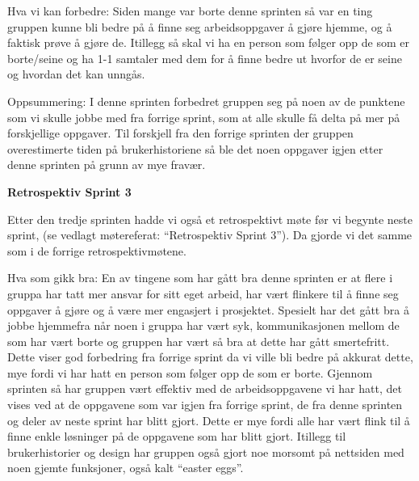\documentclass[12pt,a4paper,norsk]{article}
\begin{document}
Hva vi kan forbedre:
Siden mange var borte denne sprinten så var en ting gruppen kunne bli bedre på å finne seg arbeidsoppgaver å gjøre hjemme, og å faktisk prøve å gjøre de.
Itillegg så skal vi ha en person som følger opp de som er borte/seine og ha 1-1 samtaler med dem for å finne bedre ut hvorfor de er seine og hvordan det kan unngås. 

Oppsummering:
I denne sprinten forbedret gruppen seg på noen av de punktene som vi skulle jobbe med fra forrige sprint, som at alle skulle få delta på mer på forskjellige oppgaver. Til forskjell fra den forrige sprinten der gruppen overestimerte tiden på brukerhistoriene så ble det noen oppgaver igjen etter denne sprinten på grunn av mye fravær. 

\bigskip \noindent \textbf{Retrospektiv Sprint 3}
\par Etter den tredje sprinten hadde vi også et retrospektivt møte før vi begynte neste sprint, (se vedlagt møtereferat: “Retrospektiv Sprint 3”). Da gjorde vi det samme som i de forrige retrospektivmøtene. 

Hva som gikk bra:
En av tingene som har gått bra denne sprinten er at flere i gruppa har tatt mer ansvar for sitt eget arbeid, har vært flinkere til å finne seg oppgaver å gjøre og å være mer engasjert i prosjektet. Spesielt har det gått bra å jobbe hjemmefra når noen i gruppa har vært syk, kommunikasjonen mellom de som har vært borte og gruppen har vært så bra at dette har gått smertefritt. Dette viser god forbedring fra forrige sprint da vi ville bli bedre på akkurat dette, mye fordi vi har hatt en person som følger opp de som er borte. 
Gjennom sprinten så har gruppen vært effektiv med de arbeidsoppgavene vi har hatt, det vises ved at de oppgavene som var igjen fra forrige sprint, de fra denne sprinten og deler av neste sprint har blitt gjort. Dette er mye fordi alle har vært flink til å finne enkle løsninger på de oppgavene som har blitt gjort. 
Itillegg til brukerhistorier og design har gruppen også gjort noe morsomt på nettsiden med noen gjemte funksjoner, også kalt “easter eggs”.  
\end{document}
